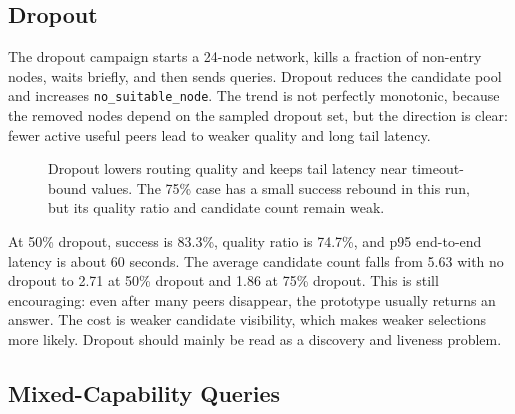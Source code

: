 \subsection{Dropout}

The dropout campaign starts a 24-node network, kills a fraction of non-entry
nodes, waits briefly, and then sends queries. Dropout reduces the candidate
pool and increases \texttt{no\_suitable\_node}. The trend is not perfectly
monotonic, because the removed nodes depend on the sampled dropout set, but the
direction is clear: fewer active useful peers lead to weaker quality and long
tail latency.

\begin{figure}[H]
\centering
{}
\caption{Dropout lowers routing quality and keeps tail latency near timeout-bound values. The 75\% case has a small success rebound in this run, but its quality ratio and candidate count remain weak.}
\end{figure}

At 50\% dropout, success is 83.3\%, quality ratio is 74.7\%, and p95 end-to-end
latency is about 60 seconds. The average candidate count falls from 5.63 with
no dropout to 2.71 at 50\% dropout and 1.86 at 75\% dropout. This is still
encouraging: even after many peers disappear, the prototype usually returns an
answer. The cost is weaker candidate visibility, which makes weaker selections
more likely. Dropout should mainly be read as a discovery and liveness problem.

\subsection{Mixed-Capability Queries}

